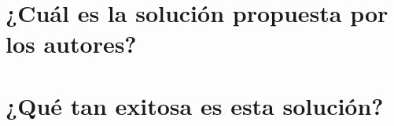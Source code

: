 \section{¿Cuál es la solución propuesta por los autores?}

\section{¿Qué tan exitosa es esta solución?} 

























